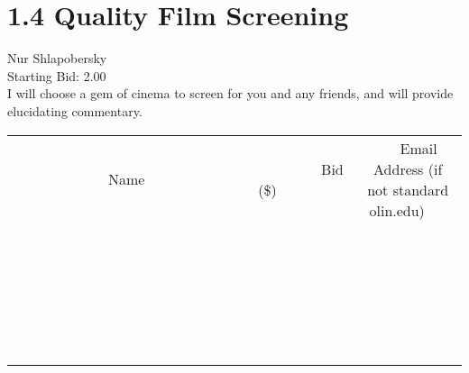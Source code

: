 \documentclass[11pt]{article}
\begin{document}
					\section*{1.4 Quality Film Screening}
					Nur Shlapobersky \\
					Starting Bid: 2.00 \\
					I will choose a gem of cinema to screen for you and any friends, and will provide elucidating commentary. \\
					[6ex]
					\begin{tabular}{c c c}
						~~~~~~~~~~~~~Name~~~~~~~~~~~~~ & ~~~~~~~~~Bid (\$)~~~~~~~~~ & ~~~Email Address (if not standard olin.edu)~~~ \\
				
 & & \\
\hline
 & & \\
\hline
 & & \\
\hline
 & & \\
\hline
 & & \\
\hline
 & & \\
\hline
 & & \\
\hline
 & & \\
\hline
 & & \\
\hline
 & & \\
\hline
 & & \\
\hline
 & & \\
\hline
 & & \\
\hline
 & & \\
\hline
 & & \\
\hline
 & & \\
\hline
 & & \\
\hline
 & & \\
\hline
 & & \\
\hline
 & & \\
\hline
 & & \\
\hline
 & & \\
\hline
 & & \\
\hline
 & & \\
\hline
 & & \\
\hline
 & & \\
\hline
					\end{tabular}
					\clearpage
				
\end{document}
